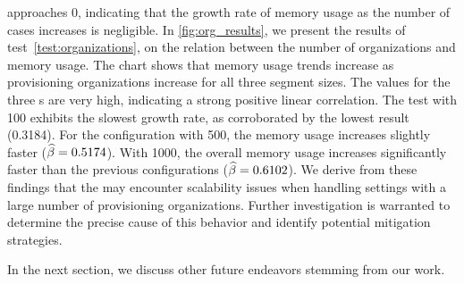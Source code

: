 approaches \num{0}, indicating that the growth rate of memory usage as the number of cases increases is negligible.
%
In \cref{fig:org_results}, we present the results of test~\ref{test:organizations}, on the relation between the number of organizations and memory usage. The chart shows that memory usage trends increase as provisioning organizations increase for all three segment sizes. The {\Rlin} values for the three {\SegSize}s are very high, %
indicating a strong positive linear correlation. %
The test with {\SegSize} \num{100} exhibits the slowest growth rate, as corroborated by the lowest {\Slope} result (\num{0.3184}). 
For the configuration with {\SegSize} \num{500}, the memory usage increases slightly faster (${\widehat{\mathcal{\beta}}} = {0.5174}$). With {\SegSize} \num{1000}, the overall memory usage increases significantly faster than the previous configurations (${\widehat{\mathcal{\beta}}} = 0.6102$). We derive from these findings that the  may encounter scalability issues when handling settings with a large number of provisioning organizations. Further investigation is warranted to determine the precise cause of this behavior and identify potential mitigation strategies. 

In the next section, we discuss other future endeavors stemming from our work.
